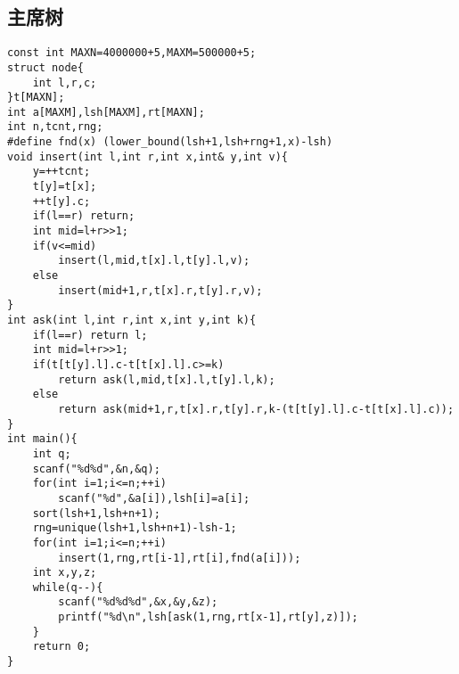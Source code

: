 \documentclass[UTF8]{ctexart}
\begin{document}
\subsection{主席树}
\begin{lstlisting}
const int MAXN=4000000+5,MAXM=500000+5;
struct node{
    int l,r,c;
}t[MAXN];
int a[MAXM],lsh[MAXM],rt[MAXN];
int n,tcnt,rng;
#define fnd(x) (lower_bound(lsh+1,lsh+rng+1,x)-lsh)
void insert(int l,int r,int x,int& y,int v){
    y=++tcnt;
    t[y]=t[x];
    ++t[y].c;
    if(l==r) return;
    int mid=l+r>>1;
    if(v<=mid) 
        insert(l,mid,t[x].l,t[y].l,v);
    else 
        insert(mid+1,r,t[x].r,t[y].r,v);
}
int ask(int l,int r,int x,int y,int k){
    if(l==r) return l;
    int mid=l+r>>1;
    if(t[t[y].l].c-t[t[x].l].c>=k)
        return ask(l,mid,t[x].l,t[y].l,k);
    else 
        return ask(mid+1,r,t[x].r,t[y].r,k-(t[t[y].l].c-t[t[x].l].c));
}
int main(){
    int q;
    scanf("%d%d",&n,&q);
    for(int i=1;i<=n;++i)
        scanf("%d",&a[i]),lsh[i]=a[i];
    sort(lsh+1,lsh+n+1);
    rng=unique(lsh+1,lsh+n+1)-lsh-1;
    for(int i=1;i<=n;++i)
        insert(1,rng,rt[i-1],rt[i],fnd(a[i]));
    int x,y,z;
    while(q--){
        scanf("%d%d%d",&x,&y,&z);
        printf("%d\n",lsh[ask(1,rng,rt[x-1],rt[y],z)]);
    }
    return 0;
} 
\end{lstlisting}
\end{document}

